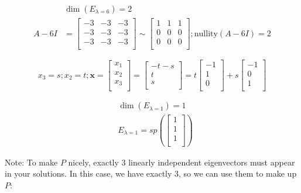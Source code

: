 \documentclass[
]{article}
\begin{document}
\begin{align*}
&\dim\left( E_{\lambda = 6} \right) = 2
 \\
A - 6I &= \begin{bmatrix}
 - 3 & - 3 & - 3 \\
 - 3 & - 3 & - 3 \\
 - 3 & - 3 & - 3 \\
\end{bmatrix}\sim\begin{bmatrix}
1 & 1 & 1 \\
0 & 0 & 0 \\
0 & 0 & 0 \\
\end{bmatrix};\text{nullity}(A - 6I) = 2
\end{align*}


$$x_{3} = s;x_{2} = t;\mathbf{x} = \begin{bmatrix}
x_{1} \\
x_{2} \\
x_{3} \\
\end{bmatrix} = \begin{bmatrix}
 - t - s \\
t \\
s \\
\end{bmatrix} = t\begin{bmatrix}
 - 1 \\
1 \\
0 \\
\end{bmatrix} + s\begin{bmatrix}
 - 1 \\
0 \\
1 \\
\end{bmatrix}$$

\begin{align*}
&\dim\left( E_{\lambda = 1} \right) = 1
 \\
&E_{\lambda = 1} = sp\left( \begin{bmatrix}
1 \\
1 \\
1 \\
\end{bmatrix} \right)
\end{align*}


Note: To make $P$ nicely, exactly 3 linearly independent eigenvectors
must appear in your solutions. In this case, we have exactly 3, so we
can use them to make up $P$:
\end{document}
